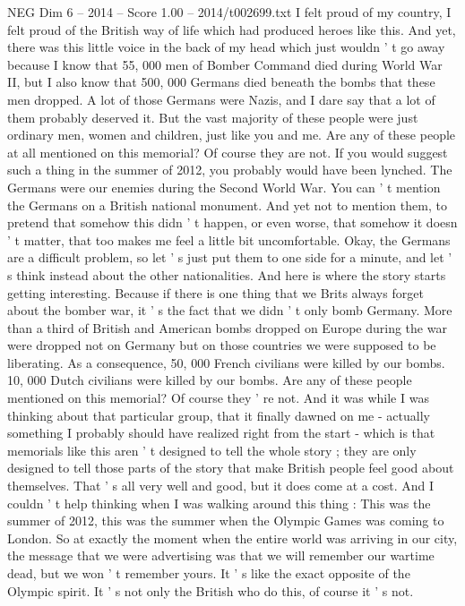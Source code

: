 \begin{textsample}{NEG Dim 6 – 2014 – Score 1.00 – 2014/t002699.txt}
I felt proud of my country, I felt proud of the British way of life which had produced heroes like this.
And yet, there was this little voice in the back of my head which just wouldn ' t go away because I know that 55, 000 men of Bomber Command died during World War II, but I also know that 500, 000 Germans died beneath the bombs that these men dropped.
A lot of those Germans were Nazis, and I dare say that a lot of them probably deserved it.
But the vast majority of these people were just ordinary men, women and children, just like you and me.
Are any of these people at all mentioned on this memorial?
Of course they are not.
If you would suggest such a thing in the summer of 2012, you probably would have been lynched.
The Germans were our enemies during the Second World War.
You can ' t mention the Germans on a British national monument.
And yet not to mention them, to pretend that somehow this didn ' t happen, or even worse, that somehow it doesn ' t matter, that too makes me feel a little bit uncomfortable.
Okay, the Germans are a difficult problem, so let ' s just put them to one side for a minute, and let ' s think instead about the other nationalities.
And here is where the story starts getting interesting.
Because if there is one thing that we Brits always forget about the bomber war, it ' s the fact that we didn ' t only bomb Germany.
More than a third of British and American bombs dropped on Europe during the war were dropped not on Germany but on those countries we were supposed to be liberating.
As a consequence, 50, 000 French civilians were killed by our bombs. 10, 000 Dutch civilians were killed by our bombs.
Are any of these people mentioned on this memorial?
Of course they ' re not.
And it was while I was thinking about that particular group, that it finally dawned on me - actually something I probably should have realized right from the start - which is that memorials like this aren ' t designed to tell the whole story ; they are only designed to tell those parts of the story that make British people feel good about themselves.
That ' s all very well and good, but it does come at a cost.
And I couldn ' t help thinking when I was walking around this thing : This was the summer of 2012, this was the summer when the Olympic Games was coming to London.
So at exactly the moment when the entire world was arriving in our city, the message that we were advertising was that we will remember our wartime dead, but we won ' t remember yours.
It ' s like the exact opposite of the Olympic spirit.
It ' s not only the British who do this, of course it ' s not.

\end{textsample}
